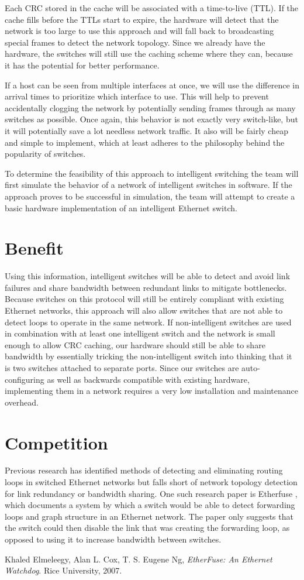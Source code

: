 \documentclass{article}
\begin{document}
	Each CRC stored in the cache will be associated with a time-to-live (TTL).
	If the cache fills before the TTLs start to expire, the hardware will detect that the network is too large to use this approach and will fall back to broadcasting special frames to detect the network topology.
        Since we already have the hardware, the switches will still use the caching scheme where they can, because it has the potential for better performance.

        If a host can be seen from multiple interfaces at once, we will use the difference in arrival times to prioritize which interface to use. 
        This will help to prevent accidentally clogging the network by potentially sending frames through as many switches as possible. Once again, this behavior is not exactly very switch-like, but it will potentially save a lot needless network traffic. 
        It also will be fairly cheap and simple to implement, which at least adheres to the philosophy behind the popularity of switches.

	To determine the feasibility of this approach to intelligent switching the team will first simulate the behavior of a network of intelligent switches in software.
	If the approach proves to be successful in simulation, the team will attempt to create a basic hardware implementation of an intelligent Ethernet switch.
\section{Benefit}
	Using this information, intelligent switches will be able to detect and avoid link failures and share bandwidth between redundant links to mitigate bottlenecks.
	Because switches on this protocol will still be entirely compliant with existing Ethernet networks, this approach will also allow switches that are not able to detect loops to operate in the same network.
	If non-intelligent switches are used in combination with at least one intelligent switch and the network is small enough to allow CRC caching, our hardware should still be able to share bandwidth by essentially tricking the non-intelligent switch into thinking that it is two switches attached to separate ports.
	Since our switches are auto-configuring as well as backwards compatible with existing hardware, implementing them in a network requires a very low installation and maintenance overhead.
\section{Competition}
	Previous research has identified methods of detecting and eliminating routing loops in switched Ethernet networks but falls short of network topology detection for link redundancy or bandwidth sharing.
	One such research paper is Etherfuse \cite{etherfuse}, which documents a system by which a switch would be able to detect forwarding loops and graph structure in an Ethernet network.
	The paper only suggests that the switch could then disable the link that was creating the forwarding loop, as opposed to using it to increase bandwidth between switches.
	
\begin{thebibliography}{9}
	Khaled Elmeleegy, Alan L. Cox, T. S. Eugene Ng,
	\emph{EtherFuse: An Ethernet Watchdog}.
	Rice University, 2007.
\end{thebibliography}
\end{document}
